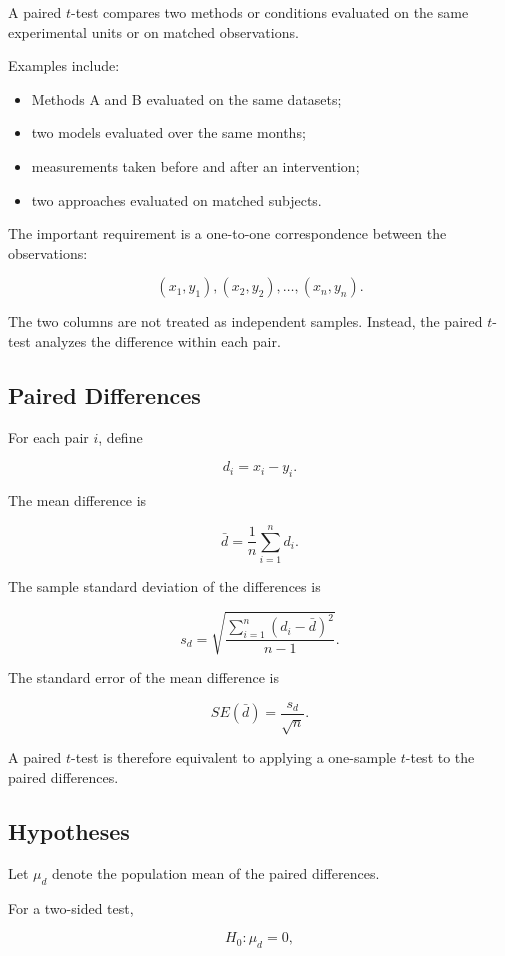 \documentclass[11pt]{article}
\begin{document}
A paired \(t\)-test compares two methods or conditions evaluated on the
same experimental units or on matched observations.

Examples include:

\begin{itemize}[noitemsep]
    \item Methods A and B evaluated on the same datasets;
    \item two models evaluated over the same months;
    \item measurements taken before and after an intervention;
    \item two approaches evaluated on matched subjects.
\end{itemize}

The important requirement is a one-to-one correspondence between the
observations:

\[
(x_1,y_1),(x_2,y_2),\ldots,(x_n,y_n).
\]

The two columns are not treated as independent samples. Instead, the
paired \(t\)-test analyzes the difference within each pair.

\subsection{Paired Differences}

For each pair \(i\), define

\[
d_i=x_i-y_i.
\]

The mean difference is

\[
\bar{d}
=
\frac{1}{n}\sum_{i=1}^{n}d_i.
\]

The sample standard deviation of the differences is

\[
s_d
=
\sqrt{
\frac{
\sum_{i=1}^{n}(d_i-\bar{d})^2
}{
n-1
}
}.
\]

The standard error of the mean difference is

\[
SE(\bar{d})=\frac{s_d}{\sqrt{n}}.
\]

A paired \(t\)-test is therefore equivalent to applying a one-sample
\(t\)-test to the paired differences.

\subsection{Hypotheses}

Let \(\mu_d\) denote the population mean of the paired differences.

For a two-sided test,

\[
H_0:\mu_d=0,
\]
\end{document}
